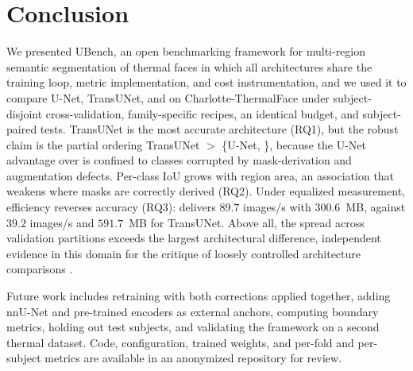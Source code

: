 \section{Conclusion} \label{sec:conclusao}

We presented UBench, an open benchmarking framework for multi-region semantic segmentation of thermal faces in which all architectures share the training loop, metric implementation, and cost instrumentation, and we used it to compare U-Net, TransUNet, and \swinp{} on Charlotte-ThermalFace under subject-disjoint cross-validation, family-specific recipes, an identical budget, and subject-paired tests.
TransUNet is the most accurate architecture (RQ1), but the robust claim is the partial ordering TransUNet $>$ \{U-Net, \swinp{}\}, because the U-Net advantage over \swinp{} is confined to classes corrupted by mask-derivation and augmentation defects.
Per-class IoU grows with region area, an association that weakens where masks are correctly derived (RQ2).
Under equalized measurement, efficiency reverses accuracy (RQ3): \swinp{} delivers $89.7$ images/s with $300.6$~MB, against $39.2$ images/s and $591.7$~MB for TransUNet.
Above all, the spread across validation partitions exceeds the largest architectural difference, independent evidence in this domain for the critique of loosely controlled architecture comparisons \cite{Isensee2024}.

Future work includes retraining with both corrections applied together, adding nnU-Net and pre-trained encoders as external anchors, computing boundary metrics, holding out test subjects, and validating the framework on a second thermal dataset.
Code, configuration, trained weights, and per-fold and per-subject metrics are available in an anonymized repository for review.
